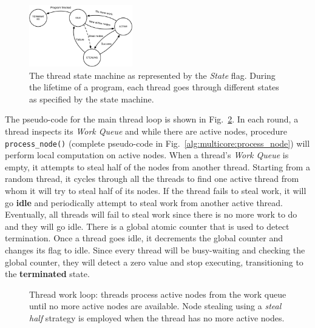 \begin{figure}[ht]
   \centering
   \includegraphics[width=0.4\textwidth]{figures/implementation/thread_states.pdf}
   \caption{The thread state machine as represented by the \emph{State} flag. During
      the lifetime of a program, each thread goes through different states as
      specified by the state machine.}
   \label{fig:implementation:thread_states}
\end{figure}

The pseudo-code for the main thread loop is shown in
Fig.~\ref{alg:thread_work_loop}. In each round, a thread inspects its \emph{Work
Queue} and while there are active nodes, procedure \texttt{process\_node()}
(complete pseudo-code in Fig.~\ref{alg:multicore:process_node}) will perform
local computation on active nodes. When a thread's \emph{Work Queue} is empty,
it attempts to steal half of the nodes from another thread. Starting from a
random thread, it cycles through all the threads to find one active thread from
whom it will try to steal half of its nodes. If the thread fails to steal work,
it will go \textbf{idle} and periodically attempt to steal work from another
active thread. Eventually, all threads will fail to steal work since there is no
more work to do and they will go idle.  There is a global atomic counter that is
used to detect termination. Once a thread goes idle, it decrements the global
counter and changes its flag to idle.  Since every thread will be busy-waiting
and checking the global counter, they will detect a zero value and stop
executing, transitioning to the \textbf{terminated} state.

\begin{figure}
\begin{algorithm}[H]
\end{algorithm}
\caption{Thread work loop: threads process active nodes from the work queue
   until no more active nodes are available. Node stealing using a \emph{steal
      half} strategy is employed when the thread has no more active nodes.}
 \label{alg:thread_work_loop}
\end{figure}

